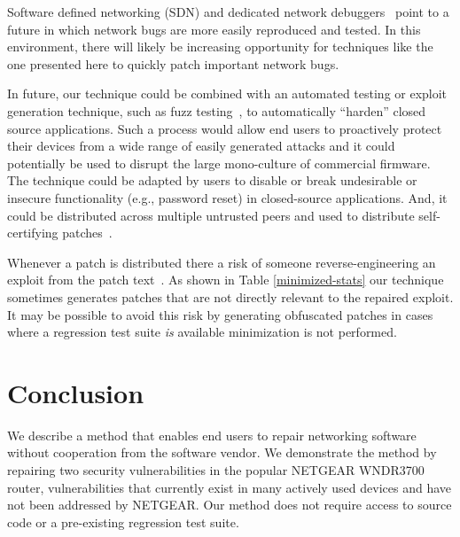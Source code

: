 \documentclass{sigcomm-alternate}
\begin{document}
Software defined networking (SDN) and dedicated network
debuggers~\cite{handigol2012debugger} point to a future in which
network bugs are more easily reproduced and tested.  In this
environment, there will likely be increasing opportunity for techniques
like the one presented here to quickly patch important network bugs.


In future, our technique could be combined with an automated testing or exploit
generation technique, such as fuzz testing~\cite{miller1990empirical},
to automatically ``harden'' closed source applications.  Such a
process would allow end users to proactively protect their
devices from a wide range of easily generated attacks and it could 
potentially be used to disrupt the large mono-culture of commercial firmware.
The technique could be adapted by users to disable or break
undesirable or insecure functionality (e.g., password reset) in
closed-source applications.  And, it could be distributed across
multiple untrusted peers and used to distribute self-certifying
patches~\cite{costa2008vigilante,schulte2013embedded}.


Whenever a patch is distributed there a risk of someone
reverse-engineering an exploit from the patch
text~\cite{brumley2008automatic}.  As shown in Table
\ref{minimized-stats} our technique sometimes generates patches that
are not directly relevant to the repaired exploit.  It may be possible
to avoid this risk by generating obfuscated patches in cases where a
regression test suite \emph{is} available minimization is not
performed.

\section{Conclusion}

We describe a method that enables end users to repair networking
software without cooperation from the software vendor.  We demonstrate
the method by repairing two security vulnerabilities in the popular
NETGEAR WNDR3700 router, vulnerabilities that currently exist in many
actively used devices and have not been addressed by NETGEAR.  Our
method does not require access to source code or a pre-existing
regression test suite.
\end{document}
